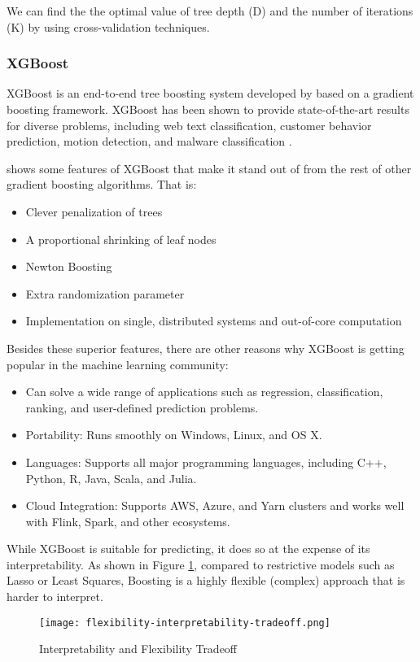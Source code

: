 We can find the the optimal value of tree depth (D) and the number of
iterations (K) by using cross-validation techniques.

\subsubsection*{XGBoost}

XGBoost is an end-to-end tree boosting system developed by
\textcite{chen2016xgboost} based on a
gradient boosting framework.  XGBoost has been shown to provide state-of-the-art
results for diverse problems, including web text classification, customer
behavior prediction, motion detection, and malware classification
\parencite{chen2016xgboost}.

\textcite{nielsen2016tree} shows some features of XGBoost that make it stand out
of from the rest of other gradient boosting algorithms. That is:
\begin{itemize}
    \item Clever penalization of trees
    \item A proportional shrinking of leaf nodes
    \item Newton Boosting
    \item Extra randomization parameter
    \item Implementation on single, distributed systems and out-of-core computation
\end{itemize}

Besides these superior features, there are other reasons why XGBoost is getting
popular in the machine learning community:
\begin{itemize}
    \item Can solve a wide range of applications such as regression,
        classification, ranking, and user-defined prediction problems.
    \item Portability: Runs smoothly on Windows, Linux, and OS X.
    \item Languages: Supports all major programming languages, including C++,
        Python, R, Java, Scala, and Julia.
    \item Cloud Integration: Supports AWS, Azure, and Yarn clusters and works
        well with Flink, Spark, and other ecosystems.
\end{itemize}

While XGBoost is suitable for predicting, it does so at the expense of its
interpretability.  As shown in Figure
\ref{fig:flexibility-interpretability-tradeoff}, compared to restrictive models
such as Lasso or Least Squares, Boosting is a highly flexible (complex) approach
that is harder to interpret.

\begin{figure}[H]\centering
    \texttt{[image: flexibility-interpretability-tradeoff.png]}
    \caption{Interpretability and Flexibility Tradeoff}
    \label{fig:flexibility-interpretability-tradeoff}
\end{figure}


